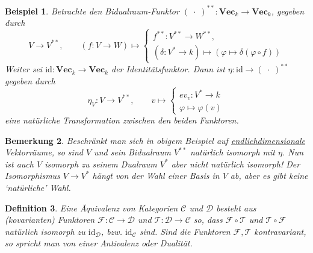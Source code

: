 \documentclass[a4paper, 11pt]{scrartcl}
\newcommand{\id}{\text{id}}
\theoremstyle{basicstyle}
\newtheorem{definition}{Definition}[section]
\newtheorem{bemerkung}[definition]{Bemerkung}
\newtheorem{beispiel}[definition]{Beispiel}
\begin{document}
    \begin{beispiel}
        Betrachte den Bidualraum-Funktor \((\;\cdot\;)^{\ast\ast}: \textbf{Vec}_k \to \textbf{Vec}_k\), gegeben durch
        \begin{equation*}
            V \to V^{\ast\ast}, \qquad
            (f: V \to W) \mapsto \begin{cases}
                f^{\ast\ast}: V^{\ast\ast} \to W^{\ast\ast}, \\
                (\delta: V^\ast \to k) \mapsto (\varphi \mapsto \delta(\varphi \circ f))
            \end{cases}
        \end{equation*}
        Weiter sei \(\id: \textbf{Vec}_k \to \textbf{Vec}_k\) der Identitätsfunktor.
        Dann ist \(\eta: \id \to (\;\cdot\;)^{\ast\ast}\) gegeben durch
        \begin{equation*}
            \eta_V : V \longrightarrow V^{\ast\ast}, \qquad v \mapsto \begin{cases}
                ev_v: V^\ast \to k \\
                \varphi \mapsto \varphi(v)
            \end{cases}
        \end{equation*}
        eine natürliche Transformation zwischen den beiden Funktoren.
    \end{beispiel}

    \begin{bemerkung}
        Beschränkt man sich in obigem Beispiel auf \underline{endlichdimensionale} Vektorräume, so sind \(V\) und sein Bidualraum \(V^{\ast\ast}\) natürlich isomorph mit \(\eta\).
        Nun ist auch \(V\) isomorph zu seinem Dualraum \(V^\ast\) aber nicht natürlich isomorph!
        Der Isomorphismus \(V \to V^\ast\) hängt von der Wahl einer Basis in \(V\) ab, aber es gibt keine `natürliche' Wahl.
    \end{bemerkung}

    \begin{definition}
        Eine \emph{Äquivalenz von Kategorien} \(\mathcal{C}\) und \(\mathcal{D}\) besteht aus (kovarianten) Funktoren \(\mathcal{F} : \mathcal{C} \to \mathcal{D}\) und \(\mathcal{T} : \mathcal{D} \to \mathcal{C}\) so, dass \(\mathcal{F} \circ \mathcal{T}\) und \(\mathcal{T} \circ \mathcal{F}\) natürlich isomorph zu \(\id_{\mathcal{D}}\), bzw. \(\id_{\mathcal{C}}\) sind.
        Sind die Funktoren \(\mathcal{F}, \mathcal{T}\) kontravariant, so spricht man von einer \emph{Antivalenz} oder \emph{Dualität}.
    \end{definition}
\end{document}
